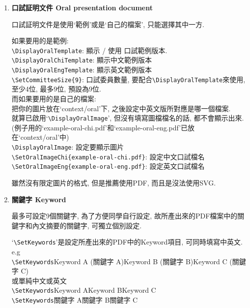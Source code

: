 \begin{enumerate}
{    使用\verb|\SetAdvisorNameA|是必須的, 而如果你的指導教授有2或3位, 那只要增加\verb|\SetAdvisorNameB|和\verb|\SetAdvisorNameC|則可.

    如: \verb|\SetAdvisorNameA{老師的中文名字}{老師的英文名字}|
  } %

  \item
  {
    \textbf{口試証明文件 Oral presentation document}

    口試証明文件是使用`範例'或是`自己的檔案', 只能選擇其中一方.

    如果要用的是範例:\\
    \verb|\DisplayOralTemplate|: 顯示 / 使用 口試範例版本.\\
    \verb|\DisplayOralChiTemplate|: 顯示中文範例版本\\
    \verb|\DisplayOralEngTemplate|: 顯示英文範例版本\\
    \verb|\SetCommitteeSize{9}|: 口試委員數量, 要配合\verb|\DisplayOralTemplate|來使用, 至少4位, 最多9位, 預設為9位.\\

    而如果要用的是自己的檔案:\\
    把你的圖片放在`context/oral'下, 之後設定中英文版所對應是哪一個檔案.\\
    就算已啟用`\verb|\DisplayOralImage|', 但沒有填寫圖檔檔名的話, 都不會顯示出來.\\
    (例子用的`example-oral-chi.pdf'和`example-oral-eng.pdf'已放在`context/oral'中)\\
    \verb|\DisplayOralImage|: 設定要顯示圖片\\
    \verb|\SetOralImageChi{example-oral-chi.pdf}|: 設定中文口試檔名\\
    \verb|\SetOralImageEng{example-oral-eng.pdf}|: 設定英文口試檔名

    雖然沒有限定圖片的格式, 但是推薦使用PDF, 而且是沒法使用SVG.
  } %

  \item
  {
    \textbf{關鍵字 Keyword}

    最多可設定9個關鍵字, 為了方便同學自行設定, 故所產出來的PDF檔案中的關鍵字和內文摘要的關鍵字, 可獨立個別設定.

    `\verb|\SetKeywords|'是設定所產出來的PDF中的Keyword項目, 可同時填寫中英文.
    e.g\\
    \verb|\SetKeywords|{Keyword A (關鍵字 A)}{Keyword B (關鍵字 B)}{Keyword C (關鍵字 C)}\\
    或單純中文或英文\\
    \verb|\SetKeywords|{Keyword A}{Keyword B}{Keyword C}\\
    \verb|\SetKeywords|{關鍵字 A}{關鍵字 B}{關鍵字 C}

}
\end{enumerate}
